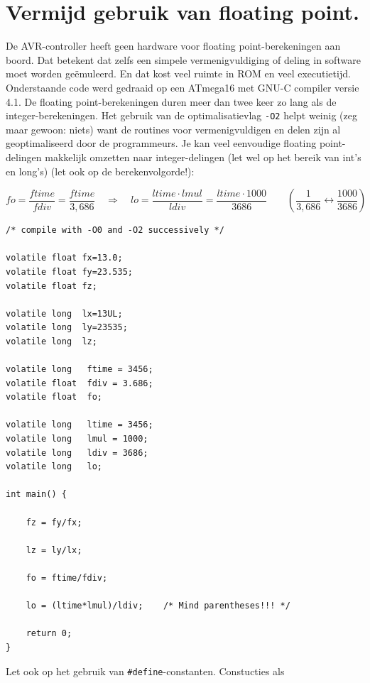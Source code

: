 \documentclass[12pt,a4paper,final,oneside,fleqn]{article}
\begin{document}
\section{Vermijd gebruik van floating point.}
De AVR-controller heeft geen hardware voor floating point-berekeningen aan boord.
Dat betekent dat zelfs een simpele vermenigvuldiging of deling in software moet
worden ge\"{e}muleerd. En dat kost veel ruimte in ROM en veel executietijd. Onderstaande
code werd gedraaid op een ATmega16 met GNU-C compiler versie 4.1. De floating point-berekeningen
duren meer dan twee keer zo lang als de integer-berekeningen. Het gebruik van de
optimalisatievlag \texttt{-O2} helpt weinig (zeg maar gewoon: niets) want de routines
voor vermenigvuldigen en delen zijn al geoptimaliseerd door de programmeurs.
Je kan veel eenvoudige floating point-delingen makkelijk omzetten naar integer-delingen
(let wel op het bereik van int's en long's) (let ook op de berekenvolgorde!):

\begin{equation}
\nonumber
fo = \frac{ftime}{fdiv}=\frac{ftime}{3,686} \quad \Rightarrow \quad
lo = \frac{ltime \cdot lmul}{ldiv} = \frac{ltime \cdot 1000}{3686} \qquad
\left(\frac{1}{3,686} \leftrightarrow \frac{1000}{3686}\right)
\end{equation}

\begin{lstlisting}[style=numbers,caption=Code met integer en floating point-berekeningen]
/* compile with -O0 and -O2 successively */

volatile float fx=13.0;
volatile float fy=23.535;
volatile float fz;

volatile long  lx=13UL;
volatile long  ly=23535;
volatile long  lz;

volatile long   ftime = 3456;
volatile float  fdiv = 3.686;
volatile float  fo;

volatile long   ltime = 3456;
volatile long   lmul = 1000;
volatile long   ldiv = 3686;
volatile long   lo;

int main() {

	fz = fy/fx;

	lz = ly/lx;

	fo = ftime/fdiv;

	lo = (ltime*lmul)/ldiv;    /* Mind parentheses!!! */

	return 0;
}
\end{lstlisting}

\noindent
Let ook op het gebruik van \texttt{\#define}-constanten. Constucties als
\end{document}
